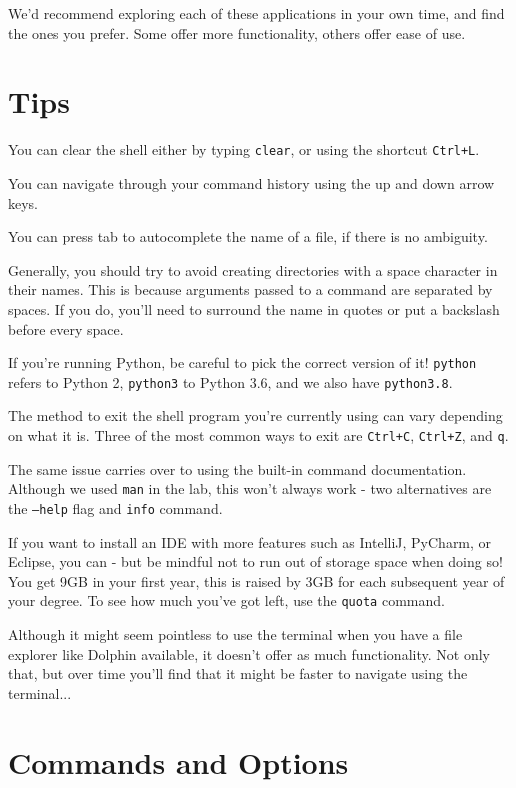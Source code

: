 \documentclass[a4paper,11pt,parskip=half-]{scrartcl}
\begin{document}
\raggedright

We'd recommend exploring each of these applications in your own time, and find the ones you prefer. Some offer more functionality, others offer ease of use.

\section*{Tips}

You can clear the shell either by typing \texttt{clear}, or using the shortcut \texttt{Ctrl+L}.

You can navigate through your command history using the up and down arrow keys.

You can press tab to autocomplete the name of a file, if there is no ambiguity.

Generally, you should try to avoid creating directories with a space character in their names. 
This is because arguments passed to a command are separated by spaces.
If you do, you'll need to surround the name in quotes or put a backslash before every space.

If you're running Python, be careful to pick the correct version of it! 
\texttt{python} refers to Python 2, \texttt{python3} to Python 3.6, and we also have \texttt{python3.8}.

The method to exit the shell program you're currently using can vary depending on what it is.
Three of the most common ways to exit are \texttt{Ctrl+C}, \texttt{Ctrl+Z}, and \texttt{q}.

The same issue carries over to using the built-in command documentation. 
Although we used \texttt{man} in the lab, this won't always work - two alternatives are the \texttt{---help} flag and \texttt{info} command.

If you want to install an IDE with more features such as IntelliJ, PyCharm, or Eclipse, you can 
- but be mindful not to run out of storage space when doing so! 
You get 9GB in your first year, this is raised by 3GB for each subsequent year of your degree. 
To see how much you've got left, use the \texttt{quota} command.

Although it might seem pointless to use the terminal when you have a file explorer like Dolphin available, it doesn't offer as much functionality. Not only that, but over time you'll find that it might be faster to navigate using the terminal...

\newpage

\section*{Commands and Options}
\end{document}

